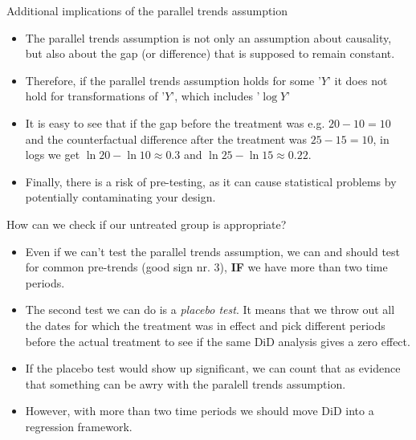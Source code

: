 \documentclass[notes,11pt, aspectratio=169]{beamer}
\begin{document}
\begin{frame}{Additional implications of the parallel trends assumption}
\begin{itemize}
    \item The parallel trends assumption is not only an assumption about causality, but also about the gap (or difference) that is supposed to remain constant.
    \item Therefore, if the parallel trends assumption holds for some '$Y$' it does not hold for transformations of '$Y$', which includes '$\log Y $'
    \item It is easy to see that if the gap before the treatment was e.g. $20-10 = 10$ and the counterfactual difference after the treatment was $25-15 = 10$, in logs we get $\ln 20 - \ln 10\approx0.3$ and $\ln 25 - \ln 15\approx0.22$. 
    \item Finally, there is a risk of pre-testing, as it can cause statistical problems by potentially contaminating your design.
\end{itemize}
\end{frame}

\begin{frame}{How can we check if our untreated group is appropriate?}
\begin{itemize}
\item Even if we can't test the parallel trends assumption, we can and should test for common pre-trends (good sign nr. 3), \textbf{IF} we have more than two time periods.
\item The second test we can do is a \emph{placebo test}. It means that we throw out all the dates for which the treatment was in effect and pick different periods before the actual treatment to see if the same DiD analysis gives a zero effect.
\item If the placebo test would show up significant, we can count that as evidence that something can be awry with the paralell trends assumption. 
\item However, with more than two time periods we should move DiD into a regression framework.
\end{itemize}
\end{frame}
\end{document}
